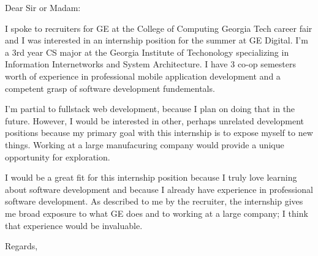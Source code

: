 \documentclass{letter}
\begin{document}
\begin{letter}{}
\opening{Dear Sir or Madam:}

I spoke to recruiters for GE at the College of Computing Georgia Tech career fair and I was interested in an internship position for the summer at GE Digital. I'm a 3rd year CS major at the Georgia Institute of Techonology specializing in Information Internetworks and System Architecture. I have 3 co-op semesters worth of experience in professional mobile application development and a competent grasp of software development fundementals. 

I'm partial to fullstack web development, because I plan on doing that in the future. However, I would be interested in other, perhaps unrelated development positions because my primary goal with this internship is to expose myself to new things. Working at a large manufacuring company would provide a unique opportunity for exploration.

I would be a great fit for this internship position because I truly love learning about software development and because I already have experience in professional software development. As described to me by the recruiter, the internship gives me broad exposure to what GE does and to working at a large company; I think that experience would be invaluable.




\closing{Regards,}
\end{letter}
\end{document}
